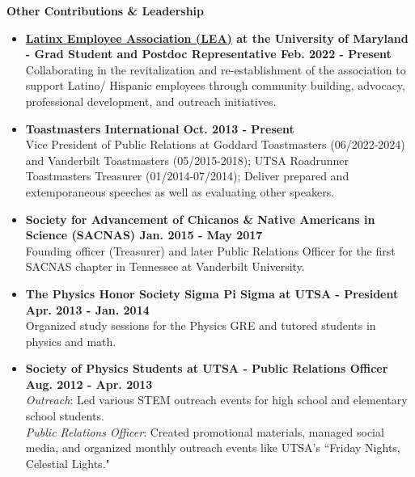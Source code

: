 \documentclass[letter,12pt]{article}
\begin{document}
\noindent
\vspace{-3mm}
{\bf Other Contributions \& Leadership} \\
\vspace{-13mm}
\begin{center}
\end{center}
\vspace{-3mm}
\begin{itemize}
    \item \textbf{\href{https://umdlatino.wordpress.com/about/board-members/}{Latinx Employee Association (LEA)} at the University of Maryland - Grad Student and Postdoc Representative \hfill Feb. 2022 - Present} \\
    Collaborating in the revitalization and re-establishment of the association to support Latino/ Hispanic employees through community building, advocacy, professional development, and outreach initiatives.
    \item \textbf{Toastmasters International \hfill Oct. 2013 - Present} \\
    Vice President of Public Relations at Goddard Toastmasters (06/2022-2024) and Vanderbilt Toastmasters (05/2015-2018); UTSA Roadrunner Toastmasters Treasurer (01/2014-07/2014); Deliver prepared and extemporaneous speeches as well as evaluating other speakers.
    \item \textbf{Society for Advancement of Chicanos \& Native Americans in Science (SACNAS) \hfill Jan. 2015 - May 2017} \\
    Founding officer (Treasurer) and later Public Relations Officer for the first SACNAS chapter in Tennessee at Vanderbilt University.
    \item \textbf{The Physics Honor Society \text{\textbar} Sigma Pi Sigma at UTSA - President \hfill Apr. 2013 - Jan. 2014} \\
    Organized study sessions for the Physics GRE and tutored students in physics and math.
    \item \textbf{Society of Physics Students at UTSA - Public Relations Officer \hfill Aug. 2012 - Apr. 2013} \\
    \textit{Outreach}: Led various STEM outreach events for high school and elementary school students. \\
    \textit{Public Relations Officer}: Created promotional materials, managed social media, and organized monthly outreach events like UTSA’s “Friday Nights, Celestial Lights."
\end{itemize}
\end{document}
